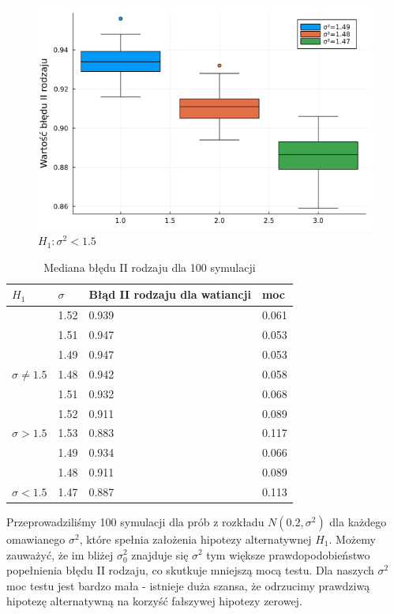 \documentclass{article}
\theoremstyle{break}
\begin{document}
\begin{figure}[H]
	\begin{center}
		\includegraphics[scale=0.5]{Z3.war3.png}
		\caption{$H_1: \sigma^2<1.5$}
	\end{center}
\end{figure}

\begin{table}[H]
	\begin{center}
		\begin{tabular}{|l|l|l|l|}
\hline
\rowcolor[HTML]{EFEFEF} 
$H_1$                               & $\sigma$   & Błąd II rodzaju dla watiancji & moc   \\ \hline
& 1.52 & 0.939                        & 0.061 \\ \cline{2-4} 
& 1.51 & 0.947                        & 0.053 \\ \cline{2-4} 
& 1.49 & 0.947                        & 0.053 \\ \cline{2-4} 
{$\sigma\ne1.5$}             & 1.48 & 0.942                        & 0.058 \\ \hline
& 1.51 & 0.932                        & 0.068 \\ \cline{2-4} 
& 1.52 & 0.911                        & 0.089 \\ \cline{2-4} 
{$\sigma>1.5$} & 1.53 & 0.883                        & 0.117 \\ \hline
& 1.49 & 0.934                        & 0.066 \\ \cline{2-4} 
& 1.48 & 0.911                        & 0.089 \\ \cline{2-4} 
{$\sigma<1.5$}    & 1.47 & 0.887                        & 0.113 \\ \hline
		\end{tabular}
		\caption{Mediana błędu II rodzaju dla 100 symulacji}
	\end{center}
\end{table}
Przeprowadziliśmy 100 symulacji dla prób z rozkładu $N(0.2,\sigma^2)$ dla każdego omawianego $\sigma^2$, które spełnia założenia hipotezy alternatywnej $H_1$. Możemy zauważyć, że im bliżej $\sigma_0^2$ znajduje się $\sigma^2$ tym większe prawdopodobieństwo popełnienia błędu II rodzaju, co skutkuje mniejszą mocą testu. Dla naszych $\sigma^2$ moc testu jest bardzo mała - istnieje duża szansa, że odrzucimy prawdziwą hipotezę alternatywną na korzyść fałszywej hipotezy zerowej. \\
\\
\end{document}
